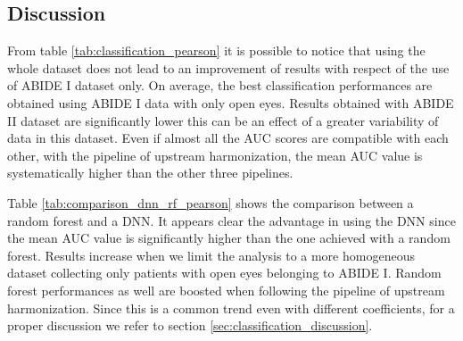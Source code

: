 \documentclass[11pt]{report}
\begin{document}
\begin{table}[h]
        \centering
    \caption{Comparison between AUC scores of a DNN and a RF classifier, using Pearson-based correlation coefficients, for dataset: ABIDE I + II and ABIDE I with open eyes}
    \label{tab:comparison_dnn_rf_pearson}
\end{table}


\subsection*{Discussion}
From table \ref{tab:classification_pearson} it is possible to notice that using the whole dataset does not lead to an improvement of results with respect of the use of ABIDE I dataset only.
On average, the best classification performances are obtained using ABIDE I data with only open eyes.
Results obtained with ABIDE II dataset are significantly lower this can be an effect of a greater variability of data in this dataset.
Even if almost all the AUC scores are compatible with each other,
with the pipeline of upstream harmonization, the mean AUC value  is systematically higher than the other three pipelines.

Table \ref{tab:comparison_dnn_rf_pearson} shows the comparison between a random forest and a DNN. It appears clear the advantage in using the DNN since the mean AUC value is significantly higher than the one achieved with a random forest.
Results increase when we limit the analysis to a more homogeneous dataset collecting only patients with open eyes belonging to ABIDE I.
Random forest performances as well are boosted when following the pipeline of upstream harmonization.
Since this is a common trend even with different coefficients, for a proper discussion we refer to section \ref{sec:classification_discussion}.
\end{document}
